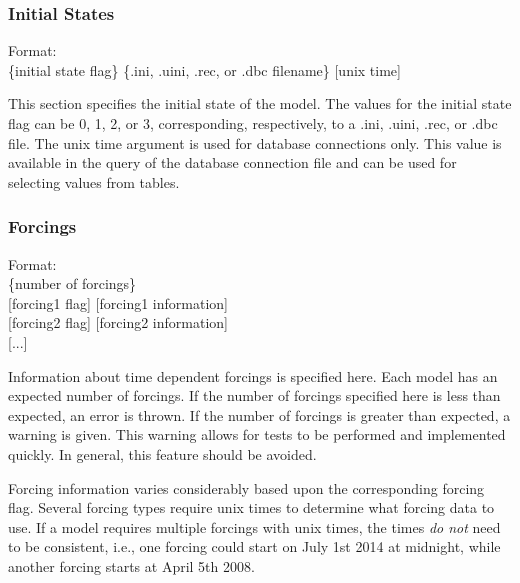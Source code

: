 \documentclass[12pt]{article}
\newenvironment{codeindent}
{\begin{list}{}
        {\setlength{\leftmargin}{.1in}}
        \item[]
}
{\end{list}}
\begin{document}
\subsubsection{Initial States} \label{sec: initial states}

\begin{codeindent}
 Format: \\
 \{initial state flag\} \{.ini, .uini, .rec, or .dbc filename\} [unix time]
\end{codeindent}

This section specifies the initial state of the model. The values for the initial state flag can be 0, 1, 2, or 3, corresponding, respectively, to a .ini, .uini, .rec, or .dbc file. The unix time argument is used for database connections only. This value is available in the query of the database connection file and can be used for selecting values from tables.


\subsubsection{Forcings} \label{sec: forcings}

\begin{codeindent}
 Format: \\
 \{number of forcings\} \\
 {[}forcing1 flag{]} {[}forcing1 information{]} \\
 {[}forcing2 flag{]} {[}forcing2 information{]} \\
 {[}...{]}
\end{codeindent}

Information about time dependent forcings is specified here. Each model has an expected number of forcings. If the number of forcings specified here is less than expected, an error is thrown. If the number of forcings is greater than expected, a warning is given. This warning allows for tests to be performed and implemented quickly. In general, this feature should be avoided.

Forcing information varies considerably based upon the corresponding forcing flag. Several forcing types require unix times to determine what forcing data to use. If a model requires multiple forcings with unix times, the times \emph{do not} need to be consistent, i.e., one forcing could start on July 1st 2014 at midnight, while another forcing starts at April 5th 2008.

\end{document}
